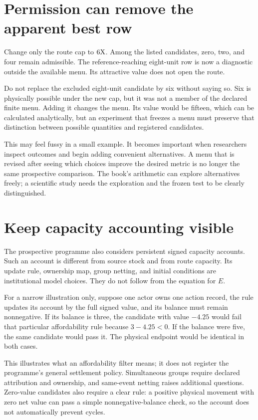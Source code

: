 \section{Permission can remove the apparent best row}

Change only the route cap to \(6\mathrm{X}\). Among the listed candidates, zero, two, and four remain admissible. The reference-reaching eight-unit row is now a diagnostic outside the available menu. Its attractive value does not open the route.

Do not replace the excluded eight-unit candidate by six without saying so. Six is physically possible under the new cap, but it was not a member of the declared finite menu. Adding it changes the menu. Its value would be fifteen, which can be calculated analytically, but an experiment that freezes a menu must preserve that distinction between possible quantities and registered candidates.

This may feel fussy in a small example. It becomes important when researchers inspect outcomes and begin adding convenient alternatives. A menu that is revised after seeing which choices improve the desired metric is no longer the same prospective comparison. The book's arithmetic can explore alternatives freely; a scientific study needs the exploration and the frozen test to be clearly distinguished.

\section{Keep capacity accounting visible}

The prospective programme also considers persistent signed capacity accounts. Such an account is different from source stock and from route capacity. Its update rule, ownership map, group netting, and initial conditions are institutional model choices. They do not follow from the equation for \(E\).

For a narrow illustration only, suppose one actor owns one action record, the rule updates its account by the full signed value, and its balance must remain nonnegative. If its balance is three, the candidate with value \(-4.25\) would fail that particular affordability rule because \(3-4.25<0\). If the balance were five, the same candidate would pass it. The physical endpoint would be identical in both cases.

This illustrates what an affordability filter means; it does not register the programme's general settlement policy. Simultaneous groups require declared attribution and ownership, and same-event netting raises additional questions. Zero-value candidates also require a clear rule: a positive physical movement with zero net value can pass a simple nonnegative-balance check, so the account does not automatically prevent cycles.

